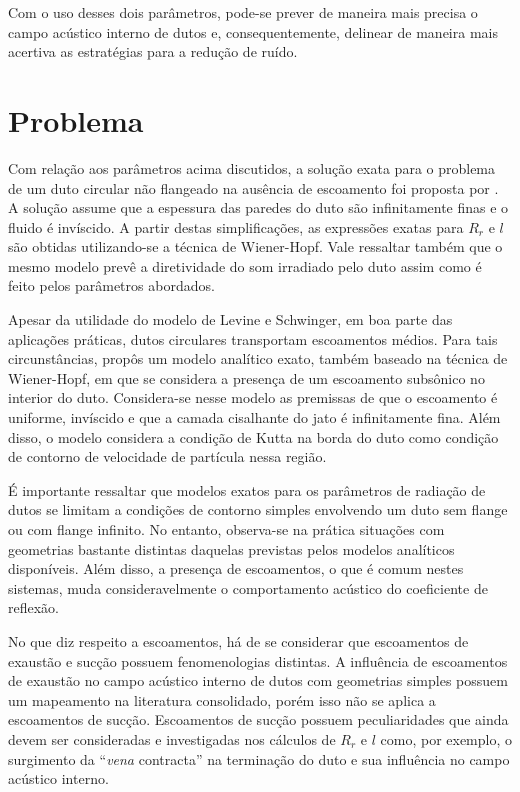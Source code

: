 Com o uso desses dois parâmetros, pode-se prever de maneira mais precisa o campo acústico interno de dutos e, consequentemente, delinear de maneira mais acertiva as estratégias para a redução de ruído.

\section{Problema}

Com relação aos parâmetros acima discutidos, a solução exata para o problema de um duto circular não flangeado na ausência de escoamento foi proposta por . A solução assume que a espessura das paredes do duto são infinitamente finas e o fluido é invíscido. A partir destas simplificações, as expressões exatas para $R_{r}$ e $l$ são obtidas utilizando-se a técnica de Wiener-Hopf. Vale ressaltar também que o mesmo modelo prevê a diretividade do som irradiado pelo duto assim como é feito pelos parâmetros abordados.

Apesar da utilidade do modelo de Levine e Schwinger, em boa parte das aplicações práticas, dutos circulares transportam escoamentos médios. Para tais circunstâncias,  propôs um modelo analítico exato, também baseado na técnica de Wiener-Hopf, em que se considera a presença de um escoamento subsônico no interior do duto. Considera-se nesse modelo as premissas de que o escoamento é uniforme, invíscido e que a camada cisalhante do jato é infinitamente fina. Além disso, o modelo considera a condição de Kutta na borda do duto como condição de contorno de velocidade de partícula nessa região.

É importante ressaltar que modelos exatos para os parâmetros de radiação de dutos se limitam a condições de contorno simples envolvendo um duto sem flange ou com flange infinito. No entanto, observa-se na prática situações com geometrias bastante distintas daquelas previstas pelos modelos analíticos disponíveis. Além disso, a presença de escoamentos, o que é comum nestes sistemas, muda consideravelmente o comportamento acústico do coeficiente de reflexão.

No que diz respeito a escoamentos, há de se considerar que escoamentos de exaustão e sucção possuem fenomenologias distintas. A influência de escoamentos de exaustão no campo acústico interno de dutos com geometrias simples possuem um mapeamento na literatura consolidado, porém isso não se aplica a escoamentos de sucção. Escoamentos de sucção possuem peculiaridades que ainda devem ser consideradas e investigadas nos cálculos de $R_{r}$ e $l$ como, por exemplo, o surgimento da ``\textit{vena} contracta'' na terminação do duto e sua influência no campo acústico interno.    

